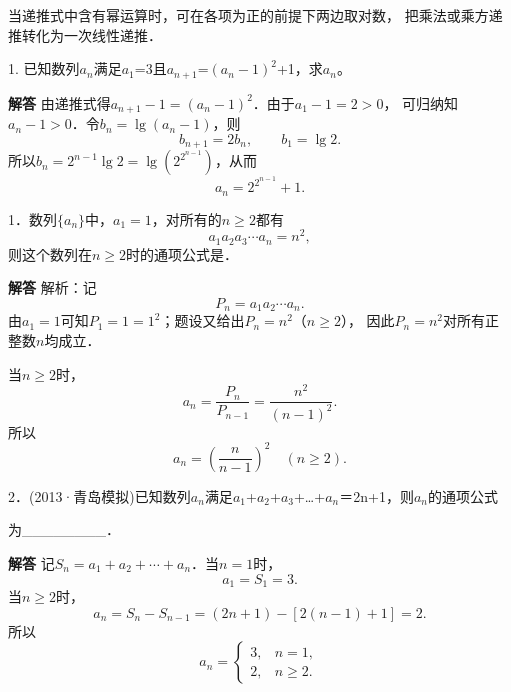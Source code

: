 \par\medskip{}\par
当递推式中含有幂运算时，可在各项为正的前提下两边取对数，
把乘法或乘方递推转化为一次线性递推．\par
{}
1. 已知数列{\ensuremath{a_{n}}}满足\ensuremath{a_{1}}=3且\ensuremath{a_{n+1}}=\ensuremath{(a_{n}-1)^{2}}+1，求\ensuremath{a_{n}}。\par
\QuestionSpace{2.5cm}
\ifshowanswers
\par\begingroup\color{solutioncolor}\noindent\textbf{解答}\quad
由递推式得$a_{n+1}-1=(a_n-1)^2$．由于$a_1-1=2>0$，
可归纳知$a_n-1>0$．令$b_n=\lg(a_n-1)$，则
\[
b_{n+1}=2b_n,\qquad b_1=\lg2.
\]
所以$b_n=2^{n-1}\lg2=\lg\!\left(2^{2^{n-1}}\right)$，从而
\[
\boxed{a_n=2^{2^{n-1}}+1}.
\]
\par\endgroup\fi

1．数列$\{a_n\}$中，$a_1=1$，对所有的$n\geq2$都有
\[
a_1a_2a_3\cdots a_n=n^2,
\]
则这个数列在$n\geq2$时的通项公式是\underline{\hspace{3cm}}．\par
\QuestionSpace{2.5cm}
\ifshowanswers
\par\begingroup\color{solutioncolor}\noindent\textbf{解答}\quad
解析：记
\[
P_n=a_1a_2\cdots a_n.
\]
由$a_1=1$可知$P_1=1=1^2$；题设又给出$P_n=n^2$（$n\geq2$），
因此$P_n=n^2$对所有正整数$n$均成立．\par
当$n\geq2$时，
\[
a_n=\frac{P_n}{P_{n-1}}
=\frac{n^2}{(n-1)^2}.
\]
所以
\[
\boxed{a_n=\left(\frac{n}{n-1}\right)^2\quad(n\geq2)}.
\]
\par
\par\endgroup\fi

2．(2013·青岛模拟)已知数列{\ensuremath{a_{n}}}满足\ensuremath{a_{1}}+\ensuremath{a_{2}}+\ensuremath{a_{3}}+\ldots{}+\ensuremath{a_{n}}＝2n+1，则{\ensuremath{a_{n}}}的通项公式\par
为\_\_\_\_\_\_\_\_．\par
\QuestionSpace{2.5cm}
\ifshowanswers
\par\begingroup\color{solutioncolor}\noindent\textbf{解答}\quad
记$S_n=a_1+a_2+\cdots+a_n$．当$n=1$时，
\[
a_1=S_1=3.
\]
当$n\geq2$时，
\[
a_n=S_n-S_{n-1}=(2n+1)-[2(n-1)+1]=2.
\]
所以
\[
\boxed{a_n=\begin{cases}
3,&n=1,\\
2,&n\geq2.
\end{cases}}
\]
\par\endgroup\fi

